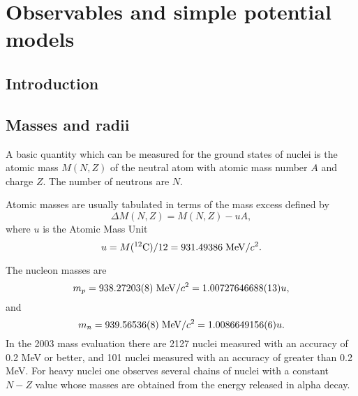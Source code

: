 \chapter{Observables and simple potential models}\label{chap:basics}


\section{Introduction}\label{sec:basics_intro}


\section{Masses and radii}
A basic quantity which can be measured for the ground states of nuclei is the atomic mass
$M(N, Z)$ of the neutral atom with atomic mass number $A$ and charge $Z$. The number of neutrons are $N$.

Atomic masses are
usually tabulated in terms of the mass excess defined by
\[
\Delta M(N, Z) =  M(N, Z) - uA,
\]
where $u$ is the Atomic Mass Unit 
\[
u = M(^{12}\mathrm{C})/12 = 931.49386 \hspace{0.1cm} \mathrm{MeV}/c^2.
\]

The nucleon masses are
\[
m_p = 938.27203(8)\hspace{0.1cm} \mathrm{MeV}/c^2 = 1.00727646688(13)u,
\]
and 
\[
m_n = 939.56536(8)\hspace{0.1cm} \mathrm{MeV}/c^2 = 1.0086649156(6)u.
\]
In the 2003 mass evaluation there are 2127 nuclei measured with an accuracy of 0.2
MeV or better, and 101 nuclei measured with an accuracy of greater than 0.2 MeV. For
heavy nuclei one observes several chains of nuclei with a constant $N-Z$ value whose masses
are obtained from the energy released in alpha decay.

